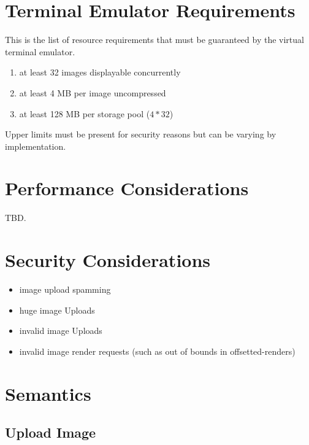 \documentclass{article}
\begin{document}
\section{Terminal Emulator Requirements} %

This is the list of resource requirements that must be guaranteed by the virtual terminal emulator.

\begin{enumerate}
    \item at least 32 images displayable concurrently
    \item at least 4 MB per image uncompressed
    \item at least 128 MB per storage pool (\(4 * 32\))
\end{enumerate}

Upper limits must be present for security reasons but can be varying by implementation.


\section{Performance Considerations} %

TBD.

\section{Security Considerations} %

\begin{itemize}
    \item image upload spamming
    \item huge image Uploads
    \item invalid image Uploads
    \item invalid image render requests (such as out of bounds in offsetted-renders)
\end{itemize}

\section{Semantics} %

\subsection{Upload Image}
\end{document}

